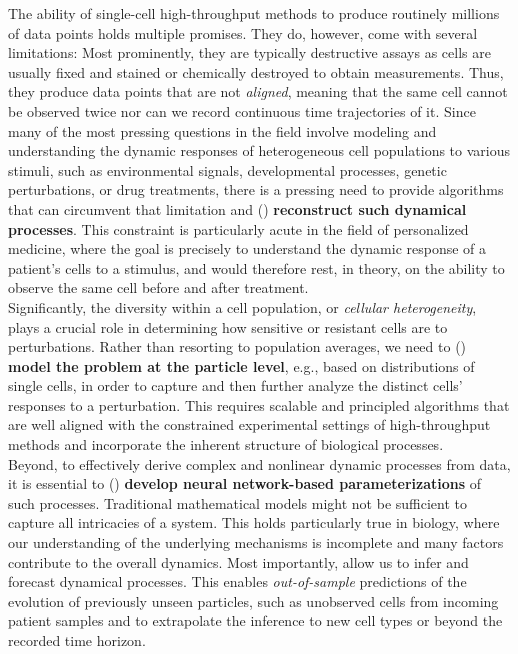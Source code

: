 The ability of single-cell high-throughput methods to produce routinely millions of data points holds multiple promises. They do, however, come with several limitations: 
 Most prominently, they are typically destructive assays as cells are usually fixed and stained or chemically destroyed to obtain measurements. Thus, they produce data points that are not \textit{aligned}, meaning that the same cell cannot be observed twice nor can we record continuous time trajectories of it.
Since many of the most pressing questions in the field involve modeling and understanding the dynamic responses of heterogeneous cell populations to various stimuli, such as environmental signals, developmental processes, genetic perturbations, or drug treatments, there is a pressing need to provide algorithms that can circumvent that limitation and () \textbf{reconstruct such dynamical processes}. 
This constraint is particularly acute in the field of personalized medicine, where the goal is precisely to understand the dynamic response of a patient's cells to a stimulus, and would therefore rest, in theory, on the ability to observe the same cell before and after treatment. \\

Significantly, the diversity within a cell population, or \textit{cellular heterogeneity}, plays a crucial role in determining how sensitive or resistant cells are to perturbations.
Rather than resorting to population averages, we need to () \textbf{model the problem at the particle level}, e.g., based on distributions of single cells, in order to capture and then further analyze the distinct cells' responses to a perturbation. 
This requires scalable and principled algorithms that are well aligned with the constrained experimental settings of high-throughput methods and incorporate the inherent structure of biological processes. \\

Beyond, to effectively derive complex and nonlinear dynamic processes from data, it is essential to () \textbf{develop neural network-based parameterizations} of such processes.
Traditional mathematical models might not be sufficient to capture all intricacies of a system. This holds particularly true in biology, where our understanding of the underlying mechanisms is incomplete and many factors contribute to the overall dynamics.
Most importantly,  allow us to infer and forecast dynamical processes. This enables \emph{out-of-sample} predictions of the evolution of previously unseen particles, such as unobserved cells from incoming patient samples and to extrapolate the inference to new cell types or beyond the recorded time horizon. \\

